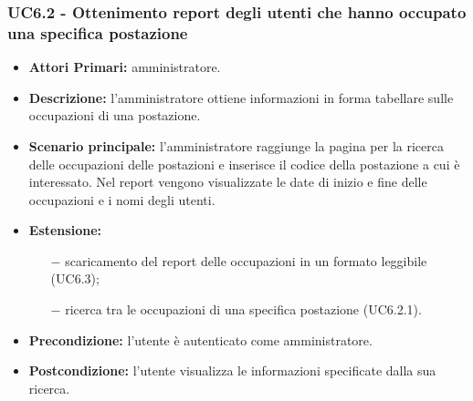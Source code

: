 \subsubsection{ UC6.2 - Ottenimento report degli utenti che hanno occupato una specifica postazione}
\begin{itemize}
	\item\textbf{Attori Primari:} 
	amministratore.
	\item\textbf{Descrizione:} 
	l'amministratore ottiene informazioni in forma tabellare sulle occupazioni di una postazione.
	\item\textbf{Scenario principale:} 
	l'amministratore raggiunge la pagina per la ricerca delle occupazioni delle postazioni e inserisce il codice della postazione a cui è interessato.
	Nel report vengono visualizzate le date di inizio e fine delle occupazioni e i nomi degli utenti.
	\item\textbf{Estensione:}
	\begin{itemize}
		\item[$-$] scaricamento del report delle occupazioni in un formato leggibile (UC6.3);
		\item[$-$] ricerca tra le occupazioni di una specifica postazione (UC6.2.1).
	\end{itemize}
	\item\textbf{Precondizione:} 
	l'utente è autenticato come amministratore.
	\item\textbf{Postcondizione:}
	l'utente visualizza le informazioni specificate dalla sua ricerca.
\end{itemize}

